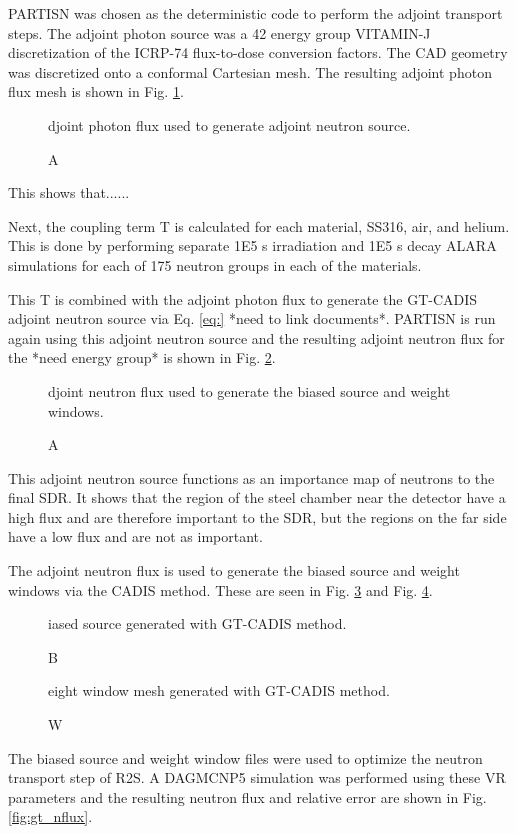 PARTISN was chosen as the deterministic code to perform the adjoint transport
steps.  The adjoint photon source was a 42 energy group VITAMIN-J discretization of the
ICRP-74 flux-to-dose conversion factors.  The CAD geometry was discretized onto
a conformal Cartesian mesh.  The resulting adjoint photon flux mesh is shown in
Fig. \ref{fig:adj_p_flux}.

\begin{figure}\label{fig:adj_p_flux}
  \caption Adjoint photon flux used to generate adjoint neutron source.  
\end{figure}

This shows that......

Next, the coupling term T is calculated for each material, SS316, air, and
helium.  This is done by performing separate 1E5 s irradiation and 1E5 s decay ALARA
simulations for each of 175 neutron groups in each of the materials.

This T is combined with the adjoint photon flux to generate the GT-CADIS
adjoint neutron source via Eq. \ref{eq:} *need to link documents*. 
PARTISN is run again using this adjoint neutron source and the resulting
adjoint neutron flux for the *need energy group* is shown in Fig.
\ref{fig:adj_n_flux}.

\begin{figure}\label{fig:adj_n_flux}
  \caption Adjoint neutron flux used to generate the biased source and weight
	windows.  
\end{figure}

This adjoint neutron source functions as an importance map of neutrons to the
final SDR.  It shows that the region of the steel chamber near the detector
have a high flux and are therefore important to the SDR, but the regions on the
far side have a low flux and are not as important.

The adjoint neutron flux is used to generate the biased source and weight
windows via the CADIS method.  These are seen in Fig. \ref{fig:biased_src} and
Fig. \ref{fig:wwinp}.

\begin{figure} \label{fig:biased_src}
  \caption Biased source generated with GT-CADIS method.
\end{figure}

\begin{figure} \label{fig:wwinp}
  \caption Weight window mesh generated with GT-CADIS method.
\end{figure}

The biased source and weight window files were used to optimize the neutron
transport step of R2S.  A DAGMCNP5 simulation was performed using these VR
parameters and the resulting neutron flux and relative error are shown in Fig.
\ref{fig:gt_nflux}.

